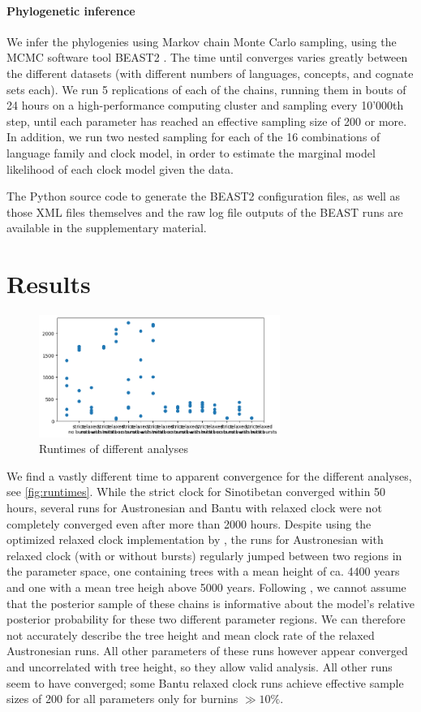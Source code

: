 \documentclass[a4paper,12pt]{scrartcl}
\begin{document}
\paragraph{Phylogenetic inference}
We infer the phylogenies using Markov chain Monte Carlo sampling, using the MCMC
software tool BEAST2 \parencite{beast2}. The time until converges varies greatly
between the different datasets (with different numbers of languages, concepts, and
cognate sets each).
We run 5 replications of each of the chains, running them in bouts of 24 hours on a high-performance
computing cluster and sampling every 10'000th step, until each parameter has reached an effective sampling size of 
200 or more.
In addition, we run two nested sampling for each of the 16 combinations of
language family and clock model, in order to estimate the marginal model likelihood
of each clock model given the data.

The Python source code to generate the BEAST2 configuration files, as well as
those XML files themselves and the raw log file outputs of the BEAST runs are
available in the supplementary material.

\section{Results}
\begin{figure}
  \centering
  \includegraphics[width=0.7\textwidth]{supplement/analysis/runtimes.png}
  \caption{Runtimes of different analyses}
\end{figure}
We find a vastly different time to apparent convergence for the different
analyses, see \cref{fig:runtimes}. While the strict clock for Sinotibetan converged within 50 hours,
several runs for Austronesian and Bantu with relaxed clock were not completely
converged even after more than 2000 hours. Despite using the optimized relaxed clock
implementation by \textcite{orc}, the runs for Austronesian with relaxed clock
(with or without bursts) regularly jumped between two regions in the parameter
space, one containing trees with a mean height of ca. 4400 years and one with a
mean tree heigh above 5000 years. Following \parencite{bad-mixing}, we cannot
assume that the posterior sample of these chains is informative about the
model's relative posterior probability for these two different parameter regions.
We can therefore not accurately describe the tree height and mean clock rate of
the relaxed Austronesian runs. All other parameters of these runs however appear
converged and uncorrelated with tree height, so they allow valid analysis.
All other runs seem to have converged; some Bantu relaxed clock runs achieve
effective sample sizes of 200 for all parameters only for burnins $\gg 10\%$.
\end{document}
